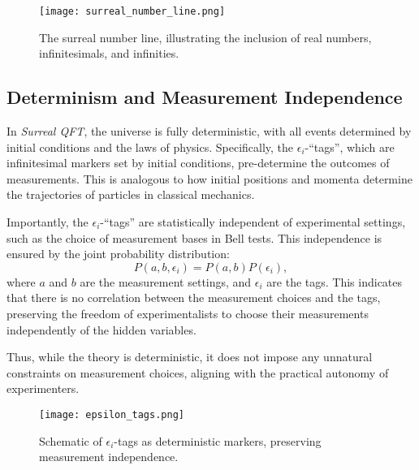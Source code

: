 \documentclass{article}
\begin{document}
\begin{figure}[htbp]
    \centering
    \texttt{[image: surreal\_number\_line.png]}
    \caption{The surreal number line, illustrating the inclusion of real numbers, infinitesimals, and infinities.}
    \label{fig:surreal_line}
\end{figure}

\subsection{Determinism and Measurement Independence}
In \textit{Surreal QFT}, the universe is fully deterministic, with all events determined by initial conditions and the laws of physics. Specifically, the \(\epsilon_i\)-``tags'', which are infinitesimal markers set by initial conditions, pre-determine the outcomes of measurements. This is analogous to how initial positions and momenta determine the trajectories of particles in classical mechanics.

Importantly, the \(\epsilon_i\)-``tags'' are statistically independent of experimental settings, such as the choice of measurement bases in Bell tests. This independence is ensured by the joint probability distribution:
\begin{equation}
P(a, b, \epsilon_i) = P(a, b) P(\epsilon_i),
\end{equation}
where \(a\) and \(b\) are the measurement settings, and \(\epsilon_i\) are the tags. This indicates that there is no correlation between the measurement choices and the tags, preserving the freedom of experimentalists to choose their measurements independently of the hidden variables.

Thus, while the theory is deterministic, it does not impose any unnatural constraints on measurement choices, aligning with the practical autonomy of experimenters.

\begin{figure}[h]
    \centering
    \texttt{[image: epsilon\_tags.png]}
    \caption{Schematic of \(\epsilon_i\)-tags as deterministic markers, preserving measurement independence.}
    \label{fig:epsilon_tags}
\end{figure}
\end{document}
